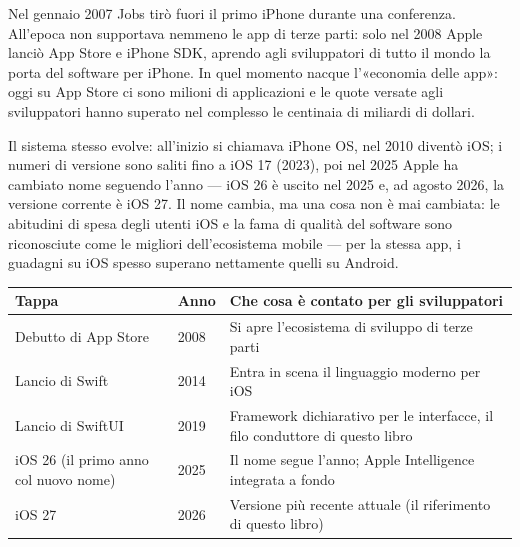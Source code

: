 


Nel gennaio 2007 Jobs tirò fuori il primo iPhone durante una conferenza. All'epoca non supportava nemmeno le app di terze parti: solo nel 2008 Apple lanciò App Store e iPhone SDK, aprendo agli sviluppatori di tutto il mondo la porta del software per iPhone. In quel momento nacque l'«economia delle app»: oggi su App Store ci sono milioni di applicazioni e le quote versate agli sviluppatori hanno superato nel complesso le centinaia di miliardi di dollari.

Il sistema stesso evolve: all'inizio si chiamava iPhone OS, nel 2010 diventò iOS; i numeri di versione sono saliti fino a iOS 17 (2023), poi nel 2025 Apple ha cambiato nome seguendo l'anno — iOS 26 è uscito nel 2025 e, ad agosto 2026, la versione corrente è iOS 27. Il nome cambia, ma una cosa non è mai cambiata: le abitudini di spesa degli utenti iOS e la fama di qualità del software sono riconosciute come le migliori dell'ecosistema mobile — per la stessa app, i guadagni su iOS spesso superano nettamente quelli su Android.

\begin{center}
\begin{tabularx}{\linewidth}{|X|X|X|}
\hline
\textbf{Tappa} & \textbf{Anno} & \textbf{Che cosa è contato per gli sviluppatori} \tabularnewline
\hline
Debutto di App Store & 2008 & Si apre l'ecosistema di sviluppo di terze parti \tabularnewline
Lancio di Swift & 2014 & Entra in scena il linguaggio moderno per iOS \tabularnewline
Lancio di SwiftUI & 2019 & Framework dichiarativo per le interfacce, il filo conduttore di questo libro \tabularnewline
iOS 26 (il primo anno col nuovo nome) & 2025 & Il nome segue l'anno; Apple Intelligence integrata a fondo \tabularnewline
iOS 27 & 2026 & Versione più recente attuale (il riferimento di questo libro) \tabularnewline
\hline
\end{tabularx}
\end{center}

